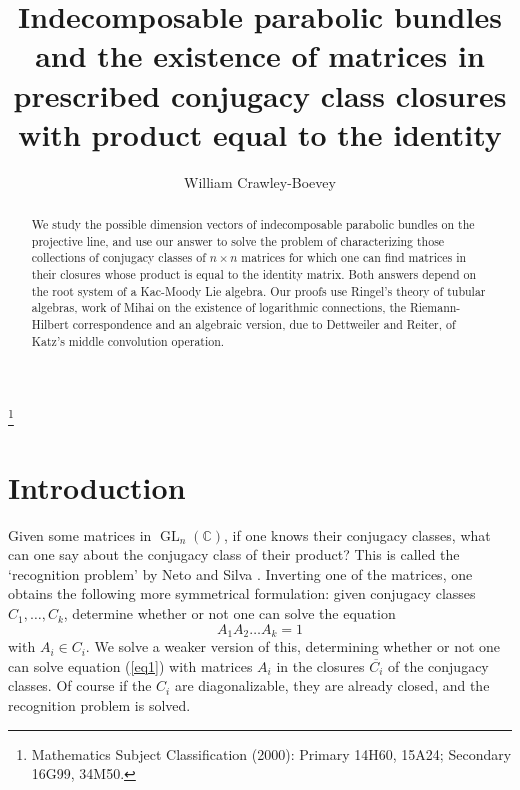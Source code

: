 \documentclass{amsart}
\theoremstyle{plain}
\theoremstyle{definition}
\theoremstyle{remark}
\newcommand{\C}{\mathbb{C}}
\DeclareMathOperator{\GL}{GL}
\begin{document}
\title[Indecomposable parabolic bundles]{Indecomposable parabolic bundles and the
existence of matrices in prescribed conjugacy class closures with product equal to the identity}


\author{William Crawley-Boevey}
\address{Department of Pure Mathematics, University of Leeds, Leeds LS2 9JT, UK}

\thanks{Mathematics Subject Classification (2000): Primary 14H60, 15A24; Secondary 16G99, 34M50.}

\begin{abstract}
We study the possible dimension vectors of indecomposable
parabolic bundles on the projective line, and use our answer
to solve the problem of characterizing those collections
of conjugacy classes of $n\times n$ matrices for which one can find matrices
in their closures whose product is equal to the
identity matrix. Both answers depend on the root system of a Kac-Moody Lie algebra.
Our proofs use Ringel's theory of tubular algebras, work of Mihai on the
existence of logarithmic connections, the Riemann-Hilbert correspondence
and an algebraic version, due to Dettweiler and Reiter, of Katz's middle convolution
operation.
\end{abstract}
\maketitle




\section{Introduction}
Given some matrices in $\GL_n(\C)$, if one knows their conjugacy classes,
what can one say about the conjugacy class of their product? This is called
the `recognition problem' by Neto and Silva \cite[\S 3]{NetoS}.
Inverting one of the matrices, one obtains the following more
symmetrical formulation: given conjugacy classes $C_1,\dots,C_k$,
determine whether or not one can solve the equation
%
\begin{equation}\label{eq1}
A_1 A_2 \dots A_k = 1
\end{equation}
%
with $A_i\in C_i$. We solve a weaker version of this, determining whether
or not one can solve equation (\ref{eq1}) with matrices $A_i$ in the closures
$\overline{C_i}$ of the conjugacy classes. Of course if the $C_i$ are diagonalizable,
they are already closed, and the recognition problem is solved.
\end{document}
